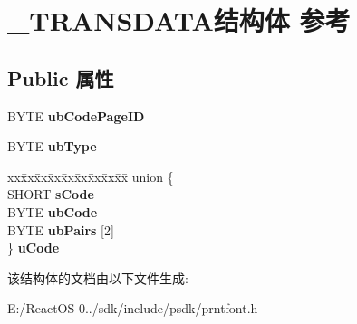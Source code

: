 \hypertarget{struct___t_r_a_n_s_d_a_t_a}{}\section{\+\_\+\+T\+R\+A\+N\+S\+D\+A\+T\+A结构体 参考}
\label{struct___t_r_a_n_s_d_a_t_a}
\subsection*{Public 属性}
\begin{DoxyCompactItemize}
\item 
\mbox{\label{struct___t_r_a_n_s_d_a_t_a_a81c8963ca64f49a47f3f1e07cd6c821a}} 
B\+Y\+TE {\bfseries ub\+Code\+Page\+ID}
\item 
\mbox{\label{struct___t_r_a_n_s_d_a_t_a_acf920d06af18660ea6ae63acadef12b0}} 
B\+Y\+TE {\bfseries ub\+Type}
\item 
\mbox{\label{struct___t_r_a_n_s_d_a_t_a_aef509d85b990527f1d887852e3b954a8}} 
\begin{tabbing}
xx\=xx\=xx\=xx\=xx\=xx\=xx\=xx\=xx\=\kill
union \{\\
\>SHORT {\bfseries sCode}\\
\>BYTE {\bfseries ubCode}\\
\>BYTE {\bfseries ubPairs} \mbox{[}2\mbox{]}\\
\} {\bfseries uCode}\\

\end{tabbing}\end{DoxyCompactItemize}


该结构体的文档由以下文件生成\+:\begin{DoxyCompactItemize}
\item 
E\+:/\+React\+O\+S-\/0../sdk/include/psdk/prntfont.\+h\end{DoxyCompactItemize}
